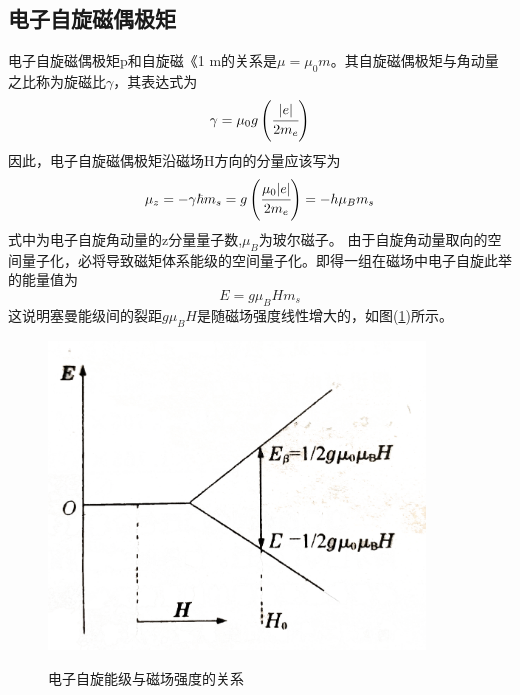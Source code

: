 \documentclass[a4paper]{article}
\begin{document}
\subsection{电子自旋磁偶极矩}
电子自旋磁偶极矩p和自旋磁《1 m的关系是$\mu = \mu_0m$。其自旋磁偶极矩与角动量之比称为旋磁比$\gamma$，其表达式为
\begin{equation}
\gamma = \mu_0g\left(\cfrac{|e|}{2m_e}\right)\label{eq1}
\end{equation}
因此，电子自旋磁偶极矩沿磁场H方向的分量应该写为
\begin{equation}
\mu_z = -\gamma\hbar m_s = g\left(\cfrac{\mu_0|e|}{2m_e}\right) = -h\mu_B m_s\label{eq2}
\end{equation}
式中为电子自旋角动量的z分量量子数,$\mu_B$为玻尔磁子。
由于自旋角动量取向的空间量子化，必将导致磁矩体系能级的空间量子化。即得一组在磁场中电子自旋此举的能量值为
\begin{equation}
E = g\mu_B Hm_s\label{eq3}
\end{equation}
这说明塞曼能级间的裂距$g\mu_BH$是随磁场强度线性增大的，如图(\ref{fig1})所示。
\begin{figure}[!h]
\centering
\includegraphics[width=10cm]{fig/fig1.jpg}\\
\caption{电子自旋能级与磁场强度的关系}\label{fig1}    
\end{figure}
\end{document}
